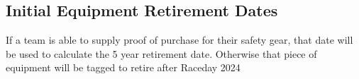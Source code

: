 \subsection*{Initial Equipment Retirement Dates}
If a team is able to supply proof of purchase for their safety gear, that date will be used to calculate the 5 year retirement date. Otherwise that piece of equipment will be tagged to retire after Raceday 2024
